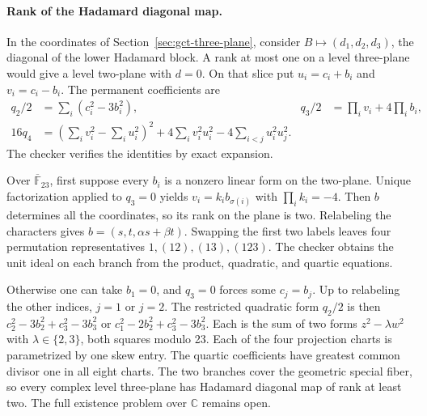 \paragraph{Rank of the Hadamard diagonal map.}
In the coordinates of Section~\ref{sec:gct-three-plane}, consider
\(B\mapsto(d_1,d_2,d_3)\), the diagonal of the lower Hadamard block.
A rank at most one on a level three-plane would give a level two-plane
with \(d=0\). On that slice put \(u_i=c_i+b_i\) and \(v_i=c_i-b_i\).
The permanent coefficients are
\begin{align*}
 q_2/2 &= \sum_i(c_i^2-3b_i^2),&
 q_3/2 &= \prod_i v_i+4\prod_i b_i,\\
 16q_4 &= \left(\sum_i v_i^2-\sum_i u_i^2\right)^2
          +4\sum_i v_i^2u_i^2-4\sum_{i<j}u_i^2u_j^2.
\end{align*}
The checker verifies the identities by exact expansion.

Over \(\overline{\mathbb F}_{23}\), first suppose every \(b_i\) is a
nonzero linear form on the two-plane. Unique factorization applied to
\(q_3=0\) yields \(v_i=k_i b_{\sigma(i)}\) with \(\prod_i k_i=-4\).
Then \(b\) determines all the coordinates, so its rank on the plane is
two. Relabeling the characters gives \(b=(s,t,\alpha s+\beta t)\).
Swapping the first two labels leaves four permutation representatives
\(1,(12),(13),(123)\). The checker obtains the unit ideal on each
branch from the product, quadratic, and quartic equations.

Otherwise one can take \(b_1=0\), and \(q_3=0\) forces some
\(c_j=b_j\). Up to relabeling the other indices, \(j=1\) or \(j=2\).
The restricted quadratic form \(q_2/2\) is then
\(c_2^2-3b_2^2+c_3^2-3b_3^2\) or
\(c_1^2-2b_2^2+c_3^2-3b_3^2\).
Each is the sum of two forms \(z^2-\lambda w^2\) with
\(\lambda\in\{2,3\}\), both squares modulo 23. Each of the four
projection charts is parametrized by one skew entry. The quartic
coefficients have greatest common divisor one in all eight charts.
The two branches cover the geometric special fiber, so every complex
level three-plane has Hadamard diagonal map of rank at least two.
The full existence problem over \(\mathbb C\) remains open.
